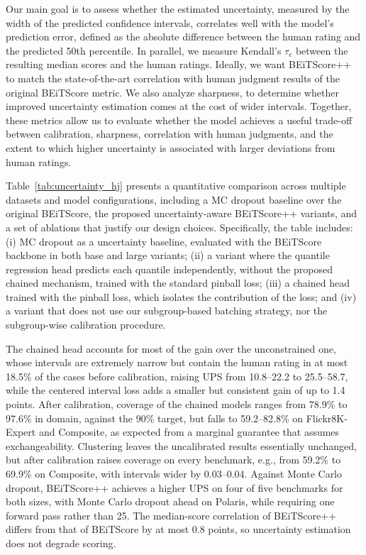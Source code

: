 \documentclass[11pt]{article}
\begin{document}


Our main goal is to assess whether the estimated uncertainty, measured by the width of the predicted confidence intervals, correlates well with the model's prediction error, defined as the absolute difference between the human rating and the predicted 50th percentile. In parallel, we measure Kendall's $\tau_c$ between the resulting median scores and the human ratings. Ideally, we want BEiTScore++ to match the state-of-the-art correlation with human judgment results of the original BEiTScore metric. We also analyze sharpness, to determine whether improved uncertainty estimation comes at the cost of wider intervals. Together, these metrics allow us to evaluate whether the model achieves a useful trade-off between calibration, sharpness, correlation with human judgments, and the extent to which higher uncertainty is associated with larger deviations from human ratings.

Table~\ref{tab:uncertainty_hj} presents a quantitative comparison across multiple datasets and model configurations, including a MC dropout baseline over the original BEiTScore, the proposed uncertainty-aware BEiTScore++ variants, and a set of ablations that justify our design choices. Specifically, the table includes: (i) MC dropout as a uncertainty baseline, evaluated with the BEiTScore backbone in both base and large variants; (ii) a variant where the quantile regression head predicts each quantile independently, without the proposed chained mechanism, trained with the standard pinball loss; (iii) a chained head trained with the pinball loss, which isolates the contribution of the loss; and (iv) a variant that does not use our subgroup-based batching strategy, nor the subgroup-wise calibration procedure. 

The chained head accounts for most of the gain over the unconstrained one, whose intervals are extremely narrow but contain the human rating in at most 18.5\% of the cases before calibration, raising UPS from 10.8--22.2 to 25.5--58.7, while the centered interval loss adds a smaller but consistent gain of up to 1.4 points. After calibration, coverage of the chained models ranges from 78.9\% to 97.6\% in domain, against the 90\% target, but falls to 59.2--82.8\% on Flickr8K-Expert and Composite, as expected from a marginal guarantee that assumes exchangeability. Clustering leaves the uncalibrated results essentially unchanged, but after calibration raises coverage on every benchmark, e.g., from 59.2\% to 69.9\% on Composite, with intervals wider by 0.03--0.04. Against Monte Carlo dropout, BEiTScore++ achieves a higher UPS on four of five benchmarks for both sizes, with Monte Carlo dropout ahead on Polaris, while requiring one forward pass rather than 25. The median-score correlation of BEiTScore++ differs from that of BEiTScore by at most 0.8 points, so uncertainty estimation does not degrade scoring.
\end{document}
